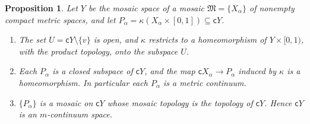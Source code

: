 \documentclass[11pt]{amsart}
\newtheorem{proposition}[theorem]{Proposition}
\theoremstyle{definition}
\theoremstyle{remark}
\newcommand{\fM}{\mathfrak{M}}
\newcommand{\cone}{\mathsf{c}}
\numberwithin{equation}{section}
\begin{document}
\begin{proposition}\label{prop:cone}
Let $Y$ be the mosaic space of a mosaic $\fM=\{X_\alpha\}$ of nonempty compact metric spaces, and let $P_\alpha=\kappa(X_\alpha\times[0,1])\subseteq\cone Y$.
\begin{enumerate}[label=\textup{(\arabic*)}]
\item The set $U=\cone Y\setminus\{v\}$ is open, and $\kappa$ restricts to a homeomorphism of $Y\times[0,1)$, with the product topology, onto the subspace $U$.
\item Each $P_\alpha$ is a closed subspace of $\cone Y$, and the map $\cone X_\alpha\to P_\alpha$ induced by $\kappa$ is a homeomorphism. In particular each $P_\alpha$ is a metric continuum.
\item $\{P_\alpha\}$ is a mosaic on $\cone Y$ whose mosaic topology is the topology of $\cone Y$. Hence $\cone Y$ is an $m$-continuum space.
\end{enumerate}
\end{proposition}
\end{document}
